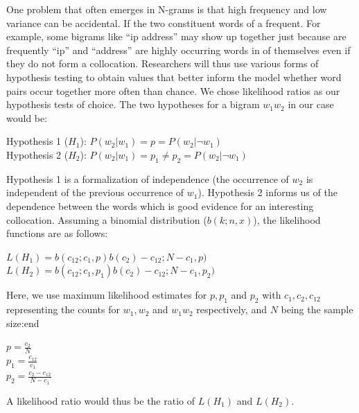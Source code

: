 \documentclass[../thesis.tex]{subfiles}
\begin{document}
One problem that often emerges in N-grams is that high frequency and low variance can be accidental. If the two constituent words of a frequent. For example, some bigrams like ``ip address'' may show up together just because  are frequently ``ip'' and ``address'' are highly occurring words in of themselves even if they do not form a collocation. Researchers will thus use various forms of hypothesis testing to obtain values that better inform the model whether word pairs occur together more often than chance. We chose likelihood ratios as our hypothesis tests of choice. The two hypotheses for a bigram $w_1w_2$ in our case would be:

\begin{center}
Hypothesis 1 ($H_1$): $P(w_2|w_1) = p = P(w_2|\neg w_1)$ \\
Hypothesis 2 ($H_2$): $P(w_2|w_1) = p_1 \neq p_2 = P(w_2|\neg w_1)$	\\	
\end{center}

Hypothesis 1 is a formalization of independence (the occurrence of $w_2$ is independent of the previous occurrence of $w_1$). Hypothesis 2 informs us of the dependence between the words which is good evidence for an interesting collocation. Assuming a binomial distribution ($b(k; n,x)$), the likelihood functions are as follows:

\begin{center}
$L(H_1) = b(c_{12}; c_1,p) b(c_2)-c_{12}; N-c_1,p)$\\
$L(H_2) = b(c_{12}; c_1,p_1) b(c_2)-c_{12}; N-c_1,p_2)$
\end{center}

Here, we use maximum likelihood estimates for $p,p_1$ and $p_2$ with $c_1,c_2,c_{12}$ representing the counts for $w_1,w_2$ and $w_1w_2$ respectively, and $N$ being the sample size:end
\begin{center}
$p=\frac{c_2}{N}$\\
$p_1=\frac{c_{12}}{c_1}$\\
$p_2=\frac{c_2-c_{12}}{N-c_1}$
\end{center}

A likelihood ratio would thus be the ratio of $L(H_1)$ and $L(H_2)$.
\end{document}
